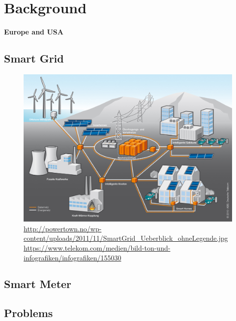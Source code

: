 \section{Background}

\paragraph{Europe and USA}

\subsection{Smart Grid}

\begin{figure}
	\includegraphics[width=\textwidth]{figures/SmartGrid_Ueberblick_ohneLegende.jpg}
	\caption{\url{http://powertown.no/wp-content/uploads/2011/11/SmartGrid_Ueberblick_ohneLegende.jpg} \url{https://www.telekom.com/medien/bild-ton-und-infografiken/infografiken/155030}}
	\label{fig:background:smartgrid}
\end{figure}

\subsection{Smart Meter}

\subsection{Problems}

